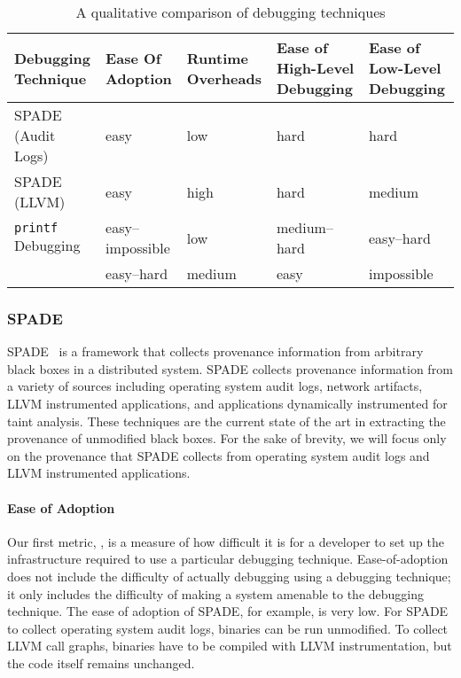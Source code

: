 \begin{table*}[t]
  \caption{A qualitative comparison of debugging techniques}
  \begin{tabular}{lllp{3cm}p{3cm}}
    \toprule
    Debugging Technique       & Ease Of Adoption & Runtime Overheads & Ease of High-Level Debugging & Ease of Low-Level Debugging \\\midrule
    SPADE (Audit Logs)        & easy             & low               & hard                         & hard \\
    SPADE (LLVM)              & easy             & high              & hard                         & medium \\
    \texttt{printf} Debugging & easy--impossible & low               & medium--hard                 & easy--hard \\
    \fluent{}                 & easy--hard       & medium            & easy                         & impossible \\
    \bottomrule
  \end{tabular}
\end{table*}

\subsubsection{SPADE}
SPADE~\cite{gehani2012spade} is a framework that collects provenance
information from arbitrary black boxes in a distributed system. SPADE collects
provenance information from a variety of sources including operating system
audit logs, network artifacts, LLVM instrumented applications, and applications
dynamically instrumented for taint analysis. These techniques are the current
state of the art in extracting the provenance of unmodified black boxes. For the
sake of brevity, we will focus only on the provenance that SPADE collects from
operating system audit logs and LLVM instrumented applications.

\paragraph{Ease of Adoption}
Our first metric, , is a measure of how difficult it
is for a developer to set up the infrastructure required to use a particular
debugging technique. Ease-of-adoption does not include the difficulty of
actually debugging using a debugging technique; it only includes the difficulty
of making a system amenable to the debugging technique.
%
The ease of adoption of SPADE, for example, is very low. For SPADE to collect
operating system audit logs, binaries can be run unmodified. To collect LLVM
call graphs, binaries have to be compiled with LLVM instrumentation, but the
code itself remains unchanged.

